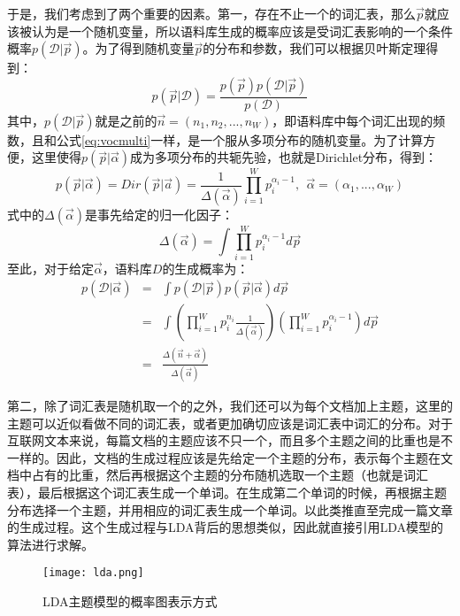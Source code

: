 于是，我们考虑到了两个重要的因素。第一，存在不止一个的词汇表，那么$\vec{p}$就应该被认为是一个随机变量，所以语料库生成的概率应该是受词汇表影响的一个条件概率$p(\mathcal{D}|\vec{p})$。为了得到随机变量$\vec{p}$的分布和参数，我们可以根据贝叶斯定理得到：
\begin{equation}
  p(\vec{p}|\mathcal{D})=\frac{p(\vec{p})p(\mathcal{D}|\vec{p})}{p(\mathcal{D})}
\end{equation}
其中，$p(\mathcal{D}|\vec{p})$就是之前的$\vec{n}=(n_1,n_2,...,n_W)$，即语料库中每个词汇出现的频数，且和公式\ref{eq:vocmulti}一样，是一个服从多项分布的随机变量。为了计算方便，这里使得$p(\vec{p}|\vec{\alpha})$成为多项分布的共轭先验，也就是Dirichlet分布，得到：
\begin{equation}
  p(\vec{p}|\vec{\alpha})=Dir(\vec{p}|\vec{a})=\frac{1}{\Delta(\vec{\alpha})}\prod_{i=1}^{W}p_i^{\alpha_i-1},~~\vec{\alpha}=(\alpha_1,...,\alpha_W)
\end{equation}
式中的$\Delta(\vec{\alpha})$是事先给定的归一化因子：
\begin{equation*}
  \Delta(\vec{\alpha})=\int \prod_{i=1}^{W}p_{i}^{\alpha_i-1}d\vec{p}
\end{equation*}
至此，对于给定$\vec{\alpha}$，语料库$D$的生成概率为：
\begin{eqnarray}
  p(\mathcal{D}|\vec{\alpha})&=&\int p(\mathcal{D}|\vec{p})p(\vec{p}|\vec{\alpha})d\vec{p} \\
                             &=&\int (\prod_{i=1}^{W}p_{i}^{n_i}\frac{1}{\Delta(\vec{\alpha})})(\prod_{i=1}^{W}p_{i}^{\alpha_i-1})d\vec{p} \\
                             &=&\frac{\Delta(\vec{n}+\vec{\alpha})}{\Delta(\vec{\alpha})}
\end{eqnarray}

第二，除了词汇表是随机取一个的之外，我们还可以为每个文档加上主题，这里的主题可以近似看做不同的词汇表，或者更加确切应该是词汇表中词汇的分布。对于互联网文本来说，每篇文档的主题应该不只一个，而且多个主题之间的比重也是不一样的。因此，文档的生成过程应该是先给定一个主题的分布，表示每个主题在文档中占有的比重，然后再根据这个主题的分布随机选取一个主题（也就是词汇表），最后根据这个词汇表生成一个单词。在生成第二个单词的时候，再根据主题分布选择一个主题，并用相应的词汇表生成一个单词。以此类推直至完成一篇文章的生成过程。这个生成过程与LDA背后的思想类似，因此就直接引用LDA模型的算法进行求解。

\begin{figure}
\centering
\texttt{[image: lda.png]}
\caption{LDA主题模型的概率图表示方式}
\label{fig:lda}
\end{figure}

